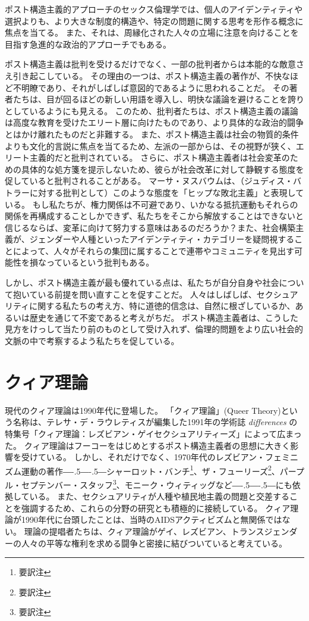 \documentclass[paper=a4,book,openany]{jlreq}
\def\DDASH{―\kern-.5\zw―\kern-.5\zw―}
\begin{document}
ポスト構造主義的アプローチのセックス倫理学では、個人のアイデンティティや選択よりも、より大きな制度的構造や、特定の問題に関する思考を形作る概念に焦点を当てる。
また、それは、周縁化された人々の立場に注意を向けることを目指す急進的な政治的アプローチでもある。

ポスト構造主義は批判を受けるだけでなく、一部の批判者からは本能的な敵意さえ引き起こしている。
その理由の一つは、ポスト構造主義の著作が、不快なほど不明瞭であり、それがしばしば意図的であるように思われることだ。
その著者たちは、目が回るほどの新しい用語を導入し、明快な議論を避けることを誇りとしているようにも見える。
このため、批判者たちは、ポスト構造主義の議論は高度な教育を受けたエリート層に向けたものであり、より具体的な政治的闘争とはかけ離れたものだと非難する。
また、ポスト構造主義は社会の物質的条件よりも文化的言説に焦点を当てるため、左派の一部からは、その視野が狭く、エリート主義的だと批判されている。
さらに、ポスト構造主義者は社会変革のための具体的な処方箋を提示しないため、彼らが社会改革に対して静観する態度を促していると批判されることがある。
マーサ・ヌスバウムは、（ジュディス・バトラーに対する批判として）このような態度を「ヒップな敗北主義」と表現している\citep{nussbaum99:_profes_of_parody}。
もし私たちが、権力関係は不可避であり、いかなる抵抗運動もそれらの関係を再構成することしかできず、私たちをそこから解放することはできないと信じるならば、変革に向けて努力する意味はあるのだろうか？また、社会構築主義が、ジェンダーや人種といったアイデンティティ・カテゴリーを疑問視することによって、人々がそれらの集団に属することで連帯やコミュニティを見出す可能性を損なっているという批判もある。

しかし、ポスト構造主義が最も優れている点は、私たちが自分自身や社会について抱いている前提を問い直すことを促すことだ。
人々はしばしば、セクシュアリティに関する私たちの考え方、特に道徳的信念は、自然に根ざしているか、あるいは歴史を通じて不変であると考えがちだ。
ポスト構造主義者は、こうした見方をけっして当たり前のものとして受け入れず、倫理的問題をより広い社会的文脈の中で考察するよう私たちを促している。

\section{クィア理論}

現代のクィア理論は1990年代に登場した。
「クィア理論」(Queer Theory)という名称は、テレサ・デ・ラウレティスが編集した1991年の学術誌 \emph{differences} の特集号「クィア理論：レズビアン・ゲイセクシュアリティーズ」によって広まった\citep{lauretis91:_diff}。
クィア理論はフーコーをはじめとするポスト構造主義者の思想に大きく影響を受けている。
しかし、それだけでなく、1970年代のレズビアン・フェミニズム運動の著作{\DDASH}シャーロット・バンチ\footnote{要訳注}、ザ・フューリーズ\footnote{要訳注}、パープル・セプテンバー・スタッフ\footnote{要訳注}、モニーク・ウィティッグなど{\DDASH}にも依拠している。
また、セクシュアリティが人種や植民地主義の問題と交差することを強調するため、これらの分野の研究とも積極的に接続している。
クィア理論が1990年代に台頭したことは、当時のAIDSアクティビズムと無関係ではない。
理論の提唱者たちは、クィア理論がゲイ、レズビアン、トランスジェンダーの人々の平等な権利を求める闘争と密接に結びついていると考えている。
\end{document}
